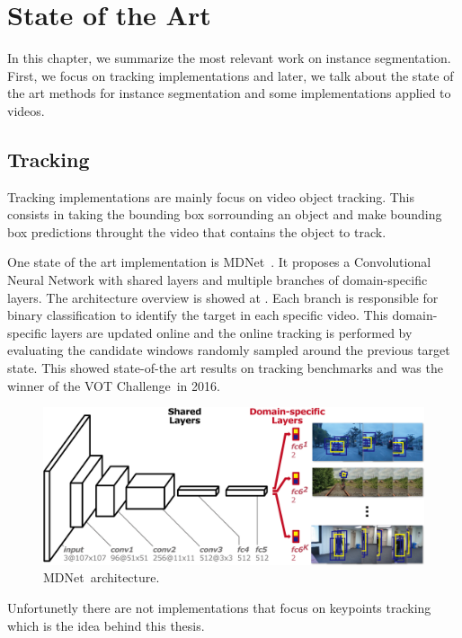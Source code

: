 
\chapter{State of the Art}
\label{cha:stateofart}

In this chapter, we summarize the most relevant work on instance segmentation.
First, we focus on tracking implementations and later, we talk about the state of the art methods for instance segmentation and some implementations applied to videos.

\section{Tracking}
\label{sec:soa_tracking}

Tracking implementations are mainly focus on video object tracking.
This consists in taking the bounding box sorrounding an object and make bounding box predictions throught the video that contains the object to track.

One state of the art implementation is MDNet~\mdnet.
It proposes a Convolutional Neural Network with shared layers and multiple branches of domain-specific layers.
The architecture overview is showed at .
Each branch is responsible for binary classification to identify the target in each specific video.
This domain-specific layers are updated online and the online tracking is performed by evaluating the candidate windows randomly sampled around the previous target state.
This showed state-of-the art results on tracking benchmarks and was the winner of the VOT Challenge~\votchallenge in 2016.

\begin{figure}[h]
  \centering
  \includegraphics[width=.8\linewidth]{figures/mdnet/architecture.png}
  \caption{MDNet~\mdnet architecture. }
  \label{fig:mdnet}
\end{figure}

Unfortunetly there are not implementations that focus on keypoints tracking which is the idea behind this thesis.

